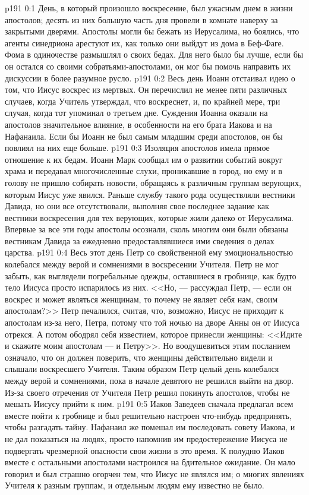 \vs p191 0:1 День, в который произошло воскресение, был ужасным днем в жизни апостолов; десять из них большую часть дня провели в комнате наверху за закрытыми дверями. Апостолы могли бы бежать из Иерусалима, но боялись, что агенты синедриона арестуют их, как только они выйдут из дома в Беф\hyp{}Фаге. Фома в одиночестве размышлял о своих бедах. Для него было бы лучше, если бы он остался со своими собратьями\hyp{}апостолами, он мог бы помочь направить их дискуссии в более разумное русло.
\vs p191 0:2 Весь день Иоанн отстаивал идею о том, что Иисус воскрес из мертвых. Он перечислил не менее пяти различных случаев, когда Учитель утверждал, что воскреснет, и, по крайней мере, три случая, когда тот упоминал о третьем дне. Суждения Иоанна оказали на апостолов значительное влияние, в особенности на его брата Иакова и на Нафанаила. Если бы Иоанн не был самым младшим среди апостолов, он бы повлиял на них еще больше.
\vs p191 0:3 Изоляция апостолов имела прямое отношение к их бедам. Иоанн Марк сообщал им о развитии событий вокруг храма и передавал многочисленные слухи, проникавшие в город, но ему и в голову не пришло собирать новости, обращаясь к различным группам верующих, которым Иисус уже явился. Раньше службу такого рода осуществляли вестники Давида, но они все отсутствовали, выполняя свое последнее задание как вестники воскресения для тех верующих, которые жили далеко от Иерусалима. Впервые за все эти годы апостолы осознали, сколь многим они были обязаны вестникам Давида за ежедневно предоставлявшиеся ими сведения о делах царства.
\vs p191 0:4 Весь этот день Петр со свойственной ему эмоциональностью колебался между верой и сомнениями в воскресении Учителя. Петр не мог забыть, как выглядели погребальные одежды, оставшиеся в гробнице, как будто тело Иисуса просто испарилось из них. <<Но, --- рассуждал Петр, --- если он воскрес и может являться женщинам, то почему не являет себя нам, своим апостолам?>> Петр печалился, считая, что, возможно, Иисус не приходит к апостолам из\hyp{}за него, Петра, потому что той ночью на дворе Анны он от Иисуса отрекся. А потом ободрял себя известием, которое принесли женщины: <<Идите и скажите моим апостолам --- и Петру>>. Но воодушевиться этим посланием означало, что он должен поверить, что женщины действительно видели и слышали воскресшего Учителя. Таким образом Петр целый день колебался между верой и сомнениями, пока в начале девятого не решился выйти на двор. Из\hyp{}за своего отречения от Учителя Петр решил покинуть апостолов, чтобы не мешать Иисусу прийти к ним.
\vs p191 0:5 Иаков Заведеев сначала предлагал всем вместе пойти к гробнице и был решительно настроен что\hyp{}нибудь предпринять, чтобы разгадать тайну. Нафанаил же помешал им последовать совету Иакова, и не дал показаться на людях, просто напомнив им предостережение Иисуса не подвергать чрезмерной опасности свои жизни в это время. К полудню Иаков вместе с остальными апостолами настроился на бдительное ожидание. Он мало говорил и был страшно огорчен тем, что Иисус не являлся им; о многих явлениях Учителя к разным группам, и отдельным людям ему известно не было.
